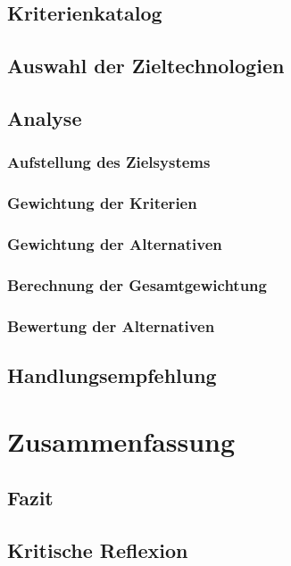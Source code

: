 \section{Kriterienkatalog}
\section{Auswahl der Zieltechnologien}
\section{Analyse}
\subsection{Aufstellung des Zielsystems}
\subsection{Gewichtung der Kriterien}
\subsection{Gewichtung der Alternativen}
\subsection{Berechnung der Gesamtgewichtung}
\subsection{Bewertung der Alternativen}
\section{Handlungsempfehlung}
\chapter{Zusammenfassung}
\section{Fazit} 
\section{Kritische Reflexion}
